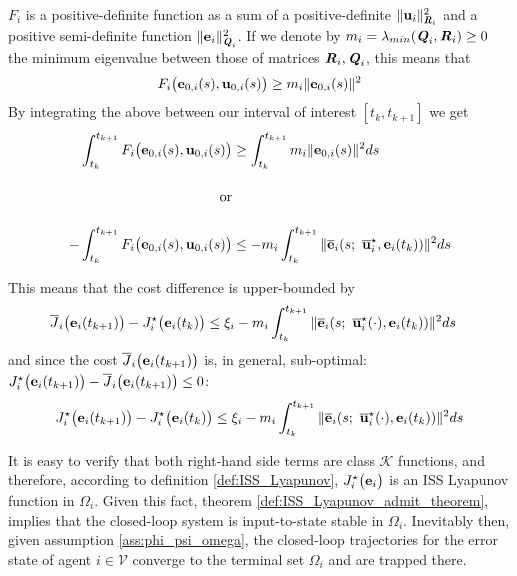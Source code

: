 \begin{gg_box}
  $F_i$ is a positive-definite function as a sum of a positive-definite
  $\|\bm{\mathbf{u}}_i\|^2_{\bm{\mathit{R}}_i}$ and a positive semi-definite function
  $\|\bm{\mathbf{e}}_i\|^2_{\bm{\mathit{Q}}_i}$. If we denote by
  $m_i = \lambda_{min}(\bm{\mathit{Q}}_i, \bm{\mathit{R}}_i) \geq 0$ the minimum eigenvalue
  between those of matrices $\bm{\mathit{R}}_i, \bm{\mathit{Q}}_i$, this means that
  \begin{align}
    F_i \big(\bm{\mathbf{e}}_{0,i}(s), \bm{\mathbf{u}}_{0,i} (s)\big) \geq m_i \|\bm{\mathbf{e}}_{0,i}(s)\|^2
  \end{align}
  By integrating the above between our interval of interest $[t_k, t_{k+1}]$ we get
  \begin{align}
    \int_{t_k}^{t_{k+1}} F_i \big(\vect{e}_{0,i}(s), \vect{u}_{0,i} (s)\big) &\geq \int_{t_k}^{t_{k+1}} m_i \|\vect{e}_{0,i}(s)\|^2 ds \\[2.5ex]
    \text{or}\\[2.5ex]
    -\int_{t_k}^{t_{k+1}} F_i \big(\vect{e}_{0,i}(s), \vect{u}_{0,i} (s)\big)
    &\leq -m_i \int_{t_k}^{t_{k+1}} \| \overline{\vect{e}}_i(s;\ \overline{\vect{u}}_i^{\star}, \vect{e}_i(t_k)) \|^2 ds
  \end{align}
\end{gg_box}
This means that the cost difference is upper-bounded by
\begin{align}
  \overline{J}_i\big(\bm{\mathbf{e}}_i(t_{k+1})\big) - J_i^{\star}\big(\bm{\mathbf{e}}_i(t_k)\big)
    &\leq \xi_i-m_i \int_{t_k}^{t_{k+1}} \| \overline{\bm{\mathbf{e}}}_i(s;\ \overline{\bm{\mathbf{u}}}_i^{\star}(\cdot), \bm{\mathbf{e}}_i(t_k)) \|^2 ds
\end{align}
and since the cost $\overline{J}_i\big(\bm{\mathbf{e}}_i(t_{k+1})\big)$ is, in general,
sub-optimal: $J_i^{\star}\big(\bm{\mathbf{e}}_i(t_{k+1})\big) - \overline{J}_i\big(\bm{\mathbf{e}}_i(t_{k+1})\big) \leq 0$:
\begin{align}
 J_i^{\star}\big(\vect{e}_i(t_{k+1})\big) - J_i^{\star}\big(\vect{e}_i(t_k)\big)
   \leq \xi_i-m_i \int_{t_k}^{t_{k+1}} \| \overline{\vect{e}}_i(s;\ \overline{\vect{u}}_i^{\star}(\cdot), \vect{e}_i(t_k)) \|^2 ds
 \label{eq:J_opt_between_consecutive_k_2}
\end{align}

It is easy to verify that both right-hand side terms are class
$\mathcal{K}$ functions, and therefore, according to definition
\eqref{def:ISS_Lyapunov}, $J_i^{\star}\big(\bm{\mathbf{e}}_i\big)$ is an ISS Lyapunov
function in $\Omega_i$. Given this fact, theorem
\eqref{def:ISS_Lyapunov_admit_theorem}, implies that the closed-loop
system is input-to-state stable in $\Omega_i$. Inevitably then, given assumption
\eqref{ass:phi_psi_omega}, the closed-loop trajectories for the error
state of agent $i \in \mathcal{V}$ converge to the terminal set $\Omega_i$
and are trapped there.

